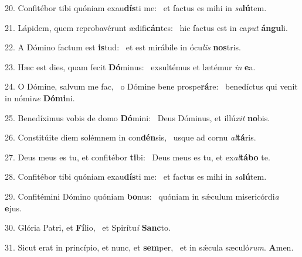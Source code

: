 20. Confitébor tibi quóniam exau\textbf{dís}ti me: \ast\  et factus es mihi in \textit{sa}\textbf{lú}tem.\

21. Lápidem, quem reprobavérunt ædifi\textbf{cán}tes: \ast\  hic factus est in ca\textit{put} \textbf{án}\textbf{gu}li.\

22. A Dómino factum est \textbf{is}tud: \ast\  et est mirábile in ócu\textit{lis} \textbf{nos}tris.\

23. Hæc est dies, quam fecit \textbf{Dó}minus: \ast\  exsultémus et lætémur \textit{in} \textbf{e}a.\

24. O Dómine, salvum me fac, \dag\  o Dómine bene prospe\textbf{rá}re: \ast\  benedíctus qui venit in nómi\textit{ne} \textbf{Dó}\textbf{mi}ni.\

25. Benedíximus vobis de domo \textbf{Dó}mini: \ast\  Deus Dóminus, et illú\textit{xit} \textbf{no}bis.\

26. Constitúite diem solémnem in con\textbf{dén}sis, \ast\  usque ad cornu \textit{al}\textbf{tá}ris.\

27. Deus meus es tu, et confitébor \textbf{ti}bi: \ast\  Deus meus es tu, et ex\textit{al}\textbf{tá}\textbf{bo} te.\

28. Confitébor tibi quóniam exau\textbf{dís}ti me: \ast\  et factus es mihi in \textit{sa}\textbf{lú}tem.\

29. Confitémini Dómino quóniam \textbf{bo}nus: \ast\  quóniam in sǽculum misericórdi\textit{a} \textbf{e}jus.\

30. Glória Patri, et \textbf{Fí}lio, \ast\  et Spirítu\textit{i} \textbf{Sanc}to.\

31. Sicut erat in princípio, et nunc, et \textbf{sem}per, \ast\  et in sǽcula sæculó\textit{rum}. \textbf{A}men.\

